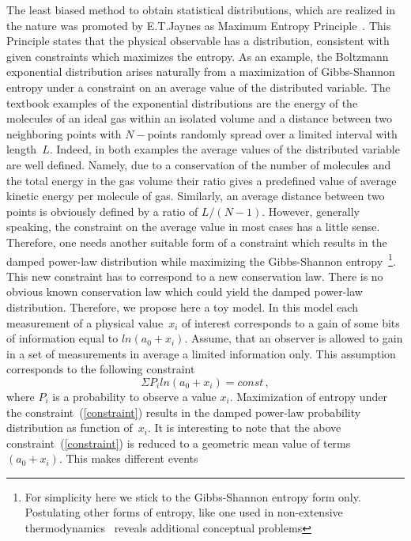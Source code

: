 \documentclass[10pt,twoside]{hsqcd}
\begin{document}
    The least biased method to obtain statistical distributions, which are 
realized in the nature was promoted by E.T.Jaynes as Maximum Entropy 
Principle~\cite{MEP}. This Principle states that the physical 
observable has a distribution, consistent with given constraints which 
maximizes the entropy. As an example, the Boltzmann exponential 
distribution arises naturally from a maximization of Gibbs-Shannon entropy 
under a constraint on an average value of the distributed variable. The 
textbook examples of the exponential distributions are the energy of the 
molecules of an ideal gas within an isolated volume and a distance between 
two neighboring points with $N-$points randomly spread over a limited 
interval with length~$L$. Indeed, in both examples the average values of 
the distributed variable are well defined. Namely, due to a conservation 
of the number of molecules and the total energy in the gas volume their 
ratio gives a predefined value of average kinetic energy per molecule of 
gas. 
Similarly, an average distance between two points is obviously defined by 
a ratio of $L/(N-1)$. However, generally speaking, the constraint on the 
average value in most cases has a little sense. Therefore, one needs 
another suitable form of a constraint which results in the damped 
power-law distribution while maximizing the Gibbs-Shannon 
entropy~\footnote{For simplicity here we stick to the Gibbs-Shannon 
entropy form only. Postulating other forms of entropy, like one used in 
non-extensive thermodynamics~\cite{Tsallis} reveals additional conceptual 
problems}. This new constraint has to correspond to a new conservation 
law. There is no obvious known conservation law which could yield the 
damped power-law distribution. Therefore, we propose here a toy model. In 
this model each measurement of a physical value~$x_i$ of interest 
corresponds to a gain of some bits of information equal to $ln(a_0+x_i)$. 
Assume, that an observer is allowed to gain in a set of measurements in 
average a limited information only. This assumption corresponds to the 
following constraint
\begin{equation}
                                \Sigma P_i ln(a_0 + x_i) = const\,,
\label{constraint}
\end{equation}
where $P_i$ is a probability to observe a value $x_i$. Maximization of 
entropy under the constraint~(\ref{constraint}) results in the damped 
power-law probability distribution as function of~$x_i$. It is interesting 
to note that the above constraint~(\ref{constraint}) is reduced to a 
geometric mean value of terms~$(a_0+x_i)$. This makes different events 
\end{document}
